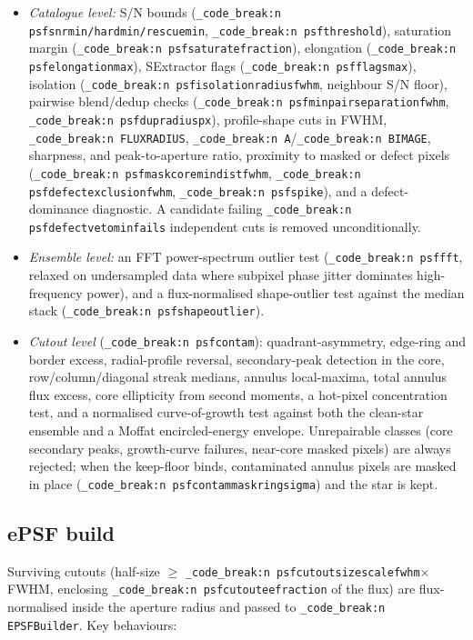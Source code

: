 \documentclass[11pt,a4paper]{article}
\renewcommand{\_}{\autophotunderscore\allowbreak}
\DeclareRobustCommand{\code}[1]{\texttt{\autophot_code_break:n {#1}}}
\begin{document}
\begin{itemize}[leftmargin=1.6em,itemsep=0.5pt]
\item \emph{Catalogue level:} S/N bounds
  (\code{psf\_snr\_min/hard\_min/rescue\_min}, \code{psf\_threshold\_*}),
  saturation margin (\code{psf\_saturate\_fraction}), elongation
  (\code{psf\_elongation\_max}), SExtractor flags
  (\code{psf\_flags\_max}), isolation
  (\code{psf\_isolation\_radius\_fwhm}, neighbour S/N floor), pairwise
  blend/dedup checks (\code{psf\_min\_pair\_separation\_fwhm},
  \code{psf\_dup\_radius\_px}), profile-shape cuts in FWHM,
  \code{FLUX\_RADIUS}, \code{A\_}\slash\code{B\_IMAGE}, sharpness, and
  peak-to-aperture ratio, proximity to masked or defect pixels
  (\code{psf\_mask\_core\_min\_dist\_fwhm},
  \code{psf\_defect\_exclusion\_fwhm}, \code{psf\_spike\_*}), and a
  defect-dominance diagnostic. A candidate failing
  \code{psf\_defect\_veto\_min\_fails} independent cuts is removed
  unconditionally.
\item \emph{Ensemble level:} an FFT power-spectrum outlier test
  (\code{psf\_fft\_*}, relaxed on undersampled data where subpixel phase
  jitter dominates high-frequency power), and a flux-normalised
  shape-outlier test against the median stack
  (\code{psf\_shape\_outlier\_*}).
\item \emph{Cutout level} (\code{psf\_contam\_*}): quadrant-asymmetry,
  edge-ring and border excess, radial-profile reversal, secondary-peak
  detection in the core, row/column/diagonal streak medians,
  annulus local-maxima, total annulus flux excess, core ellipticity from
  second moments, a hot-pixel concentration test, and a normalised
  curve-of-growth test against both the clean-star ensemble and a Moffat
  encircled-energy envelope. Unrepairable classes (core secondary peaks,
  growth-curve failures, near-core masked pixels) are always rejected;
  when the keep-floor binds, contaminated annulus pixels are masked in
  place (\code{psf\_contam\_mask\_ring\_sigma}) and the star is kept.
\end{itemize}

\subsection{ePSF build}

Surviving cutouts (half-size $\ge$
\code{psf\_cutout\_size\_scale\_fwhm}$\times$FWHM, enclosing
\code{psf\_cutout\_ee\_fraction} of the flux) are flux-normalised inside
the aperture radius and passed to \code{EPSFBuilder}. Key behaviours:
\end{document}
